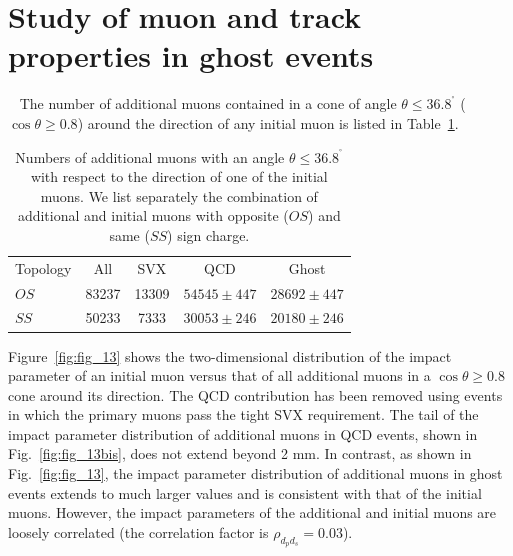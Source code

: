\documentclass[aps,prd,preprint,floatfix,nofootinbib,superscriptaddress,showpacs,amssymb]{revtex4}
\def\deg{^\circ}
\begin{document}
 \section{Study of muon and track properties in ghost events}~\label{sec:ss-a0}
 The number of additional muons contained in a cone of angle 
 $\theta \leq 36.8^{\deg}$ ($\cos \theta \geq 0.8$) around the direction
 of any initial muon is listed in Table~\ref{tab:tab_5}.
 \begin{table}
 \caption[]{Numbers of additional muons with an angle $\theta\leq 36.8^{\deg}$
            with respect to the direction of one of the initial muons. 
            We list separately the combination of additional and initial
            muons with opposite ($OS$) and same ($SS$) sign charge.}
 \begin{center}
 \begin{ruledtabular}
 \begin{tabular}{lcccc}
  Topology  &  All    &  SVX    &      QCD         &      Ghost      \\
  $OS$      &  83237  &  13309  & $54545 \pm 447$  & $28692 \pm 447$ \\
  $SS$      &  50233  &   7333  & $30053 \pm 246$  & $20180 \pm 246$ \\
 \end{tabular}
 \end{ruledtabular}
 \end{center}
 \label{tab:tab_5}
 \end{table} 
 Figure~\ref{fig:fig_13} shows the two-dimensional distribution of the
 impact parameter of an initial muon versus that of all additional muons
 in a $\cos \theta \geq 0.8$ cone around its direction. The QCD contribution  
 has been removed using events in which the primary muons pass the tight SVX 
 requirement. The tail of the impact parameter distribution of additional
 muons in QCD events, shown in Fig.~\ref{fig:fig_13bis}, does not extend
 beyond 2 mm. In contrast, as shown in Fig.~\ref{fig:fig_13}, the impact
 parameter distribution of additional muons in ghost events extends to much
 larger values and is consistent with that of the initial muons. However,
 the impact parameters of the additional and initial muons are loosely 
 correlated (the correlation factor is $\rho_{d_{p}d_{s}}=0.03 $).  
\end{document}
